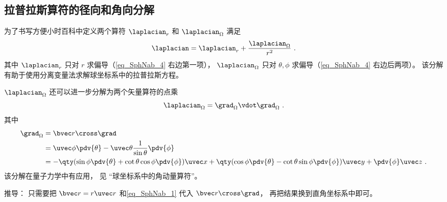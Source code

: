 \subsection{拉普拉斯算符的径向和角向分解}
为了书写方便小时百科中定义两个算符 $\laplacian_r$ 和 $\laplacian_\Omega$ 满足
\begin{equation}\label{eq_SphNab_3}
\laplacian = \laplacian_r + \frac{\laplacian_\Omega}{r^2}~.
\end{equation}
其中 $\laplacian_r$ 只对 $r$ 求偏导（\autoref{eq_SphNab_4} 右边第一项）， $\laplacian_\Omega$ 只对 $\theta,\phi$ 求偏导（\autoref{eq_SphNab_4} 右边后两项）。 该分解有助于使用分离变量法求解球坐标系中的拉普拉斯方程。

$\laplacian_\Omega$ 还可以进一步分解为两个矢量算符的点乘
\begin{equation}
\laplacian_\Omega = \grad_\Omega\vdot \grad_\Omega~.
\end{equation}
其中
\begin{equation}
\begin{aligned}
\grad_\Omega &= \bvec r \cross \grad\\
&= \uvec \phi \pdv{\theta} - \uvec \theta\frac{1}{\sin\theta} \pdv{\phi}\\
&= -\qty(\sin\phi\pdv{\theta} + \cot\theta\cos\phi\pdv{\phi})\uvec x
+ \qty(\cos\phi\pdv{\theta} - \cot\theta \sin\phi \pdv{\phi}) \uvec y
+ \pdv{\phi} \uvec z~.
\end{aligned}
\end{equation}
该分解在量子力学中有应用， 见 “球坐标系中的角动量算符”。

推导： 只需要把 $\bvec r = r \uvec r$ 和\autoref{eq_SphNab_1} 代入 $\bvec r \cross \grad$， 再把结果换到直角坐标系中即可。

